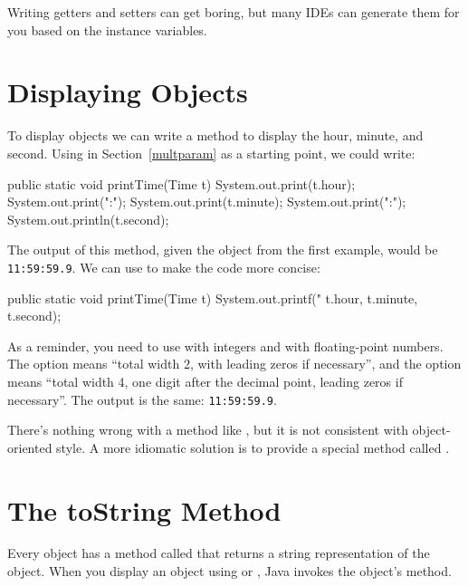 Writing getters and setters can get boring, but many IDEs can generate them for you based on the instance variables.



\section{Displaying Objects}

To display  objects we can write a method to display the hour, minute, and second.
Using  in Section~\ref{multparam} as a starting point, we could write:

\begin{code}
public static void printTime(Time t) {
    System.out.print(t.hour);
    System.out.print(":");
    System.out.print(t.minute);
    System.out.print(":");
    System.out.println(t.second);
}
\end{code}

The output of this method, given the  object from the first example, would be {\tt 11:59:59.9}.
We can use  to make the code more concise:


\begin{code}
public static void printTime(Time t) {
    System.out.printf("%
        t.hour, t.minute, t.second);
}
\end{code}

As a reminder, you need to use  with integers and  with floating-point numbers.
The  option means ``total width 2, with leading zeros if necessary'', and the  option means ``total width 4, one digit after the decimal point, leading zeros if necessary''.
The output is the same: {\tt 11:59:59.9}.

There's nothing wrong with a method like , but it is not consistent with object-oriented style.
A more idiomatic solution is to provide a special method called .


\section{The toString Method}

Every object has a method called  that returns a string representation of the object.
When you display an object using  or , Java invokes the object's  method.

